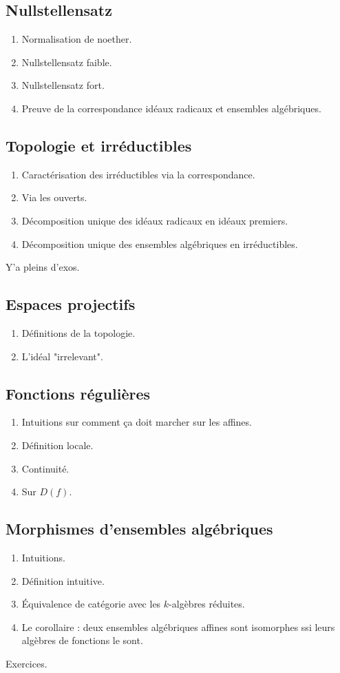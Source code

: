 \documentclass[a4paper,12pt]{book}
\theoremstyle{plain}
\theoremstyle{definition}
\theoremstyle{remark}
\begin{document}
\subsection{Nullstellensatz}
\begin{enumerate}
    \item Normalisation de noether.
    \item Nullstellensatz faible.
    \item Nullstellensatz fort.
    \item Preuve de la correspondance idéaux radicaux et ensembles
	algébriques.
\end{enumerate}

\subsection{Topologie et irréductibles}
\begin{enumerate}
    \item Caractérisation des irréductibles via la correspondance.
    \item Via les ouverts.
    \item Décomposition unique des idéaux radicaux en idéaux premiers.
    \item Décomposition unique des ensembles algébriques en 
	irréductibles.
\end{enumerate}
Y'a pleins d'exos.

\subsection{Espaces projectifs}
\begin{enumerate}
    \item Définitions de la topologie.
    \item L'idéal "irrelevant".
\end{enumerate}
\subsection{Fonctions régulières}
\begin{enumerate}
    \item Intuitions sur comment ça doit marcher sur les affines.
    \item Définition locale.
    \item Continuité.
    \item Sur $D(f)$.
\end{enumerate}
\subsection{Morphismes d'ensembles algébriques}
\begin{enumerate}
    \item Intuitions.
    \item Définition intuitive.
    \item Équivalence de catégorie avec les $k$-algèbres réduites.
    \item Le corollaire : deux ensembles algébriques affines sont 
	isomorphes ssi leurs algèbres de fonctions le sont.
\end{enumerate}
Exercices.
\end{document}
